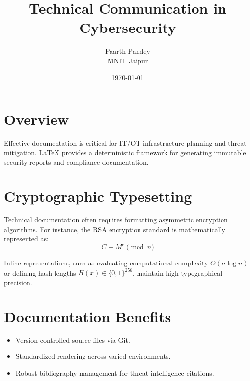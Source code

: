 ﻿\documentclass[12pt,letterpaper]{article}
\title{\textbf{Technical Communication in Cybersecurity}}
\author{Paarth Pandey \\ MNIT Jaipur}
\date{\today}
\begin{document}
\maketitle

\section{Overview}
Effective documentation is critical for IT/OT infrastructure planning and threat mitigation. \LaTeX{} provides a deterministic framework for generating immutable security reports and compliance documentation.

\section{Cryptographic Typesetting}
Technical documentation often requires formatting asymmetric encryption algorithms. For instance, the RSA encryption standard is mathematically represented as:
\begin{equation}
C \equiv M^e \pmod{n}
\end{equation}

Inline representations, such as evaluating computational complexity $O(n \log n)$ or defining hash lengths $H(x) \in \{0, 1\}^{256}$, maintain high typographical precision.

\section{Documentation Benefits}
\begin{itemize}
    \item Version-controlled source files via Git.
    \item Standardized rendering across varied environments.
    \item Robust bibliography management for threat intelligence citations.
\end{itemize}
\end{document}
